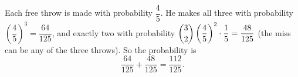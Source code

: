 Each free throw is made with probability $\dfrac45$. He makes all three with probability $\left(\dfrac45\right)^3=\dfrac{64}{125}$, and exactly two with probability $\dbinom32\left(\dfrac45\right)^2\cdot\dfrac15=\dfrac{48}{125}$ (the miss can be any of the three throws). So the probability is
\[\dfrac{64}{125}+\dfrac{48}{125}=\boxed{\dfrac{112}{125}}.\]
